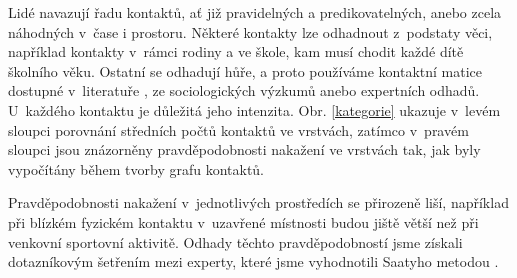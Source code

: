 Lidé navazují řadu kontaktů, ať již pravidelných a predikovatelných, anebo zcela náhodných v~čase i prostoru. 
Některé kontakty lze odhadnout z~podstaty věci, například kontakty v~rámci rodiny a ve škole, kam musí chodit každé dítě školního věku. Ostatní se odhadují hůře, a proto používáme kontaktní matice dostupné v~literatuře \cite{Prem_etal2017}, ze sociologických výzkumů anebo expertních odhadů. 
U~každého kontaktu je důležitá jeho intenzita. Obr. \ref{kategorie} ukazuje v~levém sloupci porovnání středních počtů kontaktů ve vrstvách, zatímco v~pravém sloupci jsou znázorněny pravděpodobnosti nakažení ve vrstvách tak, jak byly vypočítány během tvorby grafu kontaktů.


Pravděpodobnosti nakažení v~jednotlivých prostředích se přirozeně liší, například při blízkém fyzickém kontaktu v~uzavřené místnosti budou jiště větší než při venkovní sportovní aktivitě. Odhady těchto pravděpodobností jsme získali dotazníkovým šet\-ře\-ním mezi experty, které jsme vyhodnotili Saatyho metodou \cite{M-techrep2021}.

